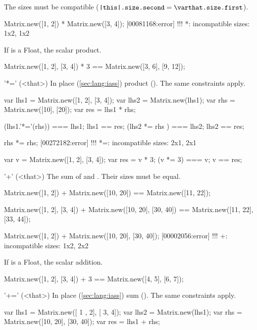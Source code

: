 \begin{urbiscriptapi}
The sizes must be compatible ($\texttt{\this.size.second} =
\texttt{\that.size.first}$).
\begin{urbiscript}
Matrix.new([1, 2]) * Matrix.new([3, 4]);
[00081168:error] !!! *: incompatible sizes: 1x2, 1x2
\end{urbiscript}

  If \that is a Float, the scalar product.
\begin{urbiassert}
Matrix.new([1, 2], [3, 4]) * 3 == Matrix.new([3, 6], [9, 12]);
\end{urbiassert}

\item['*='](<that>)%
  In place (\autoref{sec:lang:iass}) product ().  The same
  constraints apply.
\begin{urbiassert}
var lhs1 = Matrix.new([1, 2], [3, 4]);
var lhs2 = Matrix.new(lhs1);
var rhs = Matrix.new([10], [20]);
var res = lhs1 * rhs;

(lhs1.'*='(rhs)) === lhs1;  lhs1 == res;
(lhs2  *=  rhs ) === lhs2;  lhs2 == res;

rhs *= rhs;
[00272182:error] !!! *=: incompatible sizes: 2x1, 2x1
\end{urbiassert}

\begin{urbiassert}
var v = Matrix.new([1, 2], [3, 4]);
var res = v * 3;
(v *= 3) === v; v == res;
\end{urbiassert}


\item['+'](<that>)%
  The sum of \this and \that.  Their sizes must be equal.
\begin{urbiassert}
Matrix.new([1, 2]) + Matrix.new([10, 20])
  == Matrix.new([11, 22]);

Matrix.new([1, 2], [3, 4]) + Matrix.new([10, 20], [30, 40])
  == Matrix.new([11, 22], [33, 44]);

Matrix.new([1, 2]) + Matrix.new([10, 20], [30, 40]);
[00002056:error] !!! +: incompatible sizes: 1x2, 2x2
\end{urbiassert}

  If \that is a Float, the scalar addition.
\begin{urbiassert}
Matrix.new([1, 2], [3, 4]) + 3 == Matrix.new([4, 5], [6, 7]);
\end{urbiassert}


\item['+='](<that>)%
  In place (\autoref{sec:lang:iass}) sum ().  The same
  constraints apply.
\begin{urbiassert}
var lhs1 = Matrix.new([ 1 , 2], [ 3,  4]);
var lhs2 = Matrix.new(lhs1);
var rhs = Matrix.new([10, 20], [30, 40]);
var res = lhs1 + rhs;


\end{urbiassert}
\end{urbiscriptapi}
